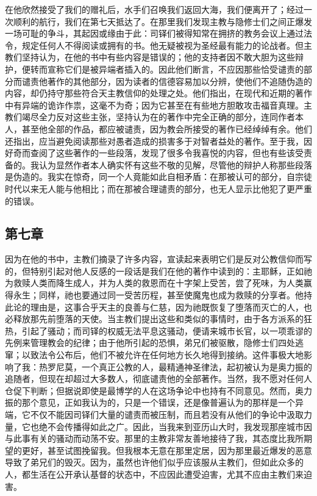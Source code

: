 在他欣然接受了我们的赠礼后，水手们召唤我们返回大海，我们便离开了；经过一次顺利的航行，我们在第七天抵达了。在那里我们发现主教与隐修士们之间正爆发一场可耻的争斗，其起因或缘由于此：司铎们被得知常在拥挤的教务会议上通过法令，规定任何人不得阅读或拥有的书。他无疑被视为圣经最有能力的论战者。但主教们坚持认为，在他的书中有些内容是错误的；他的支持者因不敢大胆为这些辩护，便转而宣称它们是被异端者插入的。因此他们断言，不应因那些恰受谴责的部分而谴责他著作的其他部分，因为读者的信德容易加以分辨，使他们不追随伪造的内容，却仍持守那些符合天主教信仰的处理之处。他们指出，在现代和近期的著作中有异端的诡诈作祟，这毫不为奇；因为它甚至在有些地方胆敢攻击福音真理。主教们竭尽全力反对这些主张，坚持认为在的著作中完全正确的部分，连同作者本人，甚至他全部的作品，都应被谴责，因为教会所接受的著作已经绰绰有余。他们还指出，应当避免阅读那些对愚者造成的损害多于对智者益处的著作。至于我，因好奇而查阅了这些著作的一些段落，发现了很多令我喜悦的内容，但也有些该受责备的。我认为显然作者本人确实怀有这些不敬的见解，尽管他的辩护人称那些段落是伪造的。我实在惊奇，同一个人竟能如此自相矛盾：在那被认可的部分，自宗徒时代以来无人能与他相比；而在那被合理谴责的部分，也无人显示比他犯了更严重的错误。\newline{}\par


\subsection{第七章}

因为在他的书中，主教们摘录了许多内容，宣读起来表明它们是反对公教信仰而写的，但特别引起对他人反感的一段话是我们在他的著作中读到的：主耶稣，正如祂为救赎人类而降生成人，并为人类的救恩而在十字架上受苦，尝了死味，为人类赢得永生；同样，祂也要通过同一受苦历程，甚至使魔鬼也成为救赎的分享者。他持此论的理由是，这事合乎天主的良善与仁慈，因为祂既恢复了堕落而灭亡的人，也必释放那先前堕落的天使。当主教们提出这些和类似的事情时，由于各方派系的狂热，引起了骚动；而司铎的权威无法平息这骚动，便请来城市长官，以一项乖谬的先例来管理教会的纪律；由于他所引起的恐惧，弟兄们被驱散，隐修士们四处逃窜；以致法令公布后，他们不被允许在任何地方长久地得到接纳。这件事极大地影响了我：热罗尼莫，一个真正公教的人，最精通神圣律法，起初被认为是奥力振的追随者，但现在却超过大多数人，彻底谴责他的全部著作。当然，我不愿对任何人仓促下判断；但据说即使是最博学的人在这场争论中也持有不同意见。然而，奥力振的那个意见，正如我认为的，只是一个错误，还是像普遍认为的那样是一个异端，它不仅不能因司铎们大量的谴责而被压制，而且若没有从他们的争论中汲取力量，它也绝不会传播得如此之广。因此，当我来到亚历山大时，我发现那座城市因与此事有关的骚动而动荡不安。那里的主教非常友善地接待了我，其态度比我所期望的更好，甚至试图挽留我。但我根本无意在那里定居，因为那里最近爆发的恶意导致了弟兄们的毁灭。因为，虽然也许他们似乎应该服从主教们，但如此众多的人，都生活在公开承认基督的状态中，不应因此遭受迫害，尤其不应由主教们来迫害。\par

